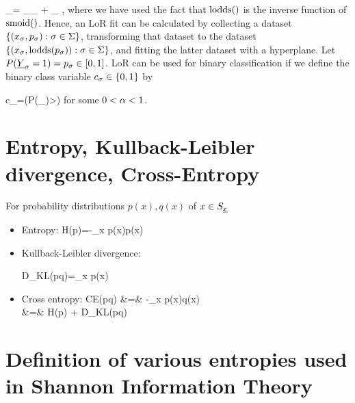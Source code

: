 \beq
{}
_{\ln {}}=
_{\haty_\s} + \eps_\s
\quad{}\;,
\eeq
where we have used the fact that
${\rm lodds}()$
is the inverse function of ${\rm smoid}()$.
Hence, an LoR
fit can be calculated by
collecting a dataset
$\{(x_\sigma, p_\sigma):\sigma\in\Sigma\}$,
transforming that
dataset to the dataset
$\{(x_\sigma,{\rm lodds}( p_\sigma)):\sigma\in\Sigma\}$,
and fitting the latter dataset
with a hyperplane.
Let $P({\underline{Y}}_\sigma=1)=p_\sigma\in [0,1]$.
LoR can be used
for binary
classification
if we define the
binary class
variable $c_\sigma\in \{0,1\}$ by

\beq
c_\s =\indi(P(\rvY_)>\alp)
\eeq
for some $0<\alpha<1$.



\section{Entropy,
 Kullback-Leibler divergence, Cross-Entropy}

For probability distributions $p(x), q(x)$ of $x\in S_{\underline{x}}$
\begin{itemize}
\item
Entropy:
\beq
H(p)=-\sum_x p(x)\ln p(x)
\eeq

\item
Kullback-Leibler divergence:

\beq
D_{KL}(p\parallel q)=\sum_{x} p(x)\ln {}
\eeq
\item
Cross entropy:
\beqa
CE(p\parallel q) &=& -\sum_x p(x)\ln q(x)\\
&=& H(p) + D_{KL}(p\parallel q)
\eeqa
\end{itemize}

\section{Definition of various
entropies used in Shannon Information Theory}

